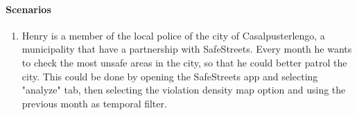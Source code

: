 \paragraph{Scenarios}
\begin{enumerate}
    \item Henry is a member of the local police of the city of Casalpusterlengo, a municipality that have a partnership with SafeStreets. Every month he wants to check the most unsafe areas in the city, so that he could better patrol the city. This could be done by opening the SafeStreets app and selecting "analyze" tab, then selecting the violation density map option and using the previous month as temporal filter.
\end{enumerate}